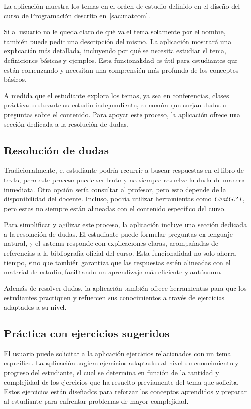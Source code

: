 \documentclass{article}
\begin{document}
La aplicación muestra los temas en el orden de estudio definido en el diseño del curso de Programación descrito en~\ref{sac:matcom}.

Si al usuario no le queda claro de qué va el tema solamente por el nombre, también puede pedir una descripción del mismo. La aplicación mostrará una explicación más detallada, incluyendo por qué se necesita estudiar el tema, definiciones básicas y ejemplos. Esta funcionalidad es útil para estudiantes que están comenzando y necesitan una comprensión más profunda de los conceptos básicos.

A medida que el estudiante explora los temas, ya sea en conferencias, clases prácticas o durante su estudio independiente, es común que surjan dudas o preguntas sobre el contenido. Para apoyar este proceso, la aplicación ofrece una sección dedicada a la resolución de dudas.

\subsection{Resolución de dudas}

Tradicionalmente, el estudiante podría recurrir a buscar respuestas en el libro de texto, pero este proceso puede ser lento y no siempre resuelve la duda de manera inmediata. Otra opción sería consultar al profesor, pero esto depende de la disponibilidad del docente. Incluso, podría utilizar herramientas como \textit{ChatGPT}, pero estas no siempre están alineadas con el contenido específico del curso.

Para simplificar y agilizar este proceso, la aplicación incluye una sección dedicada a la resolución de dudas. El estudiante puede formular preguntas en lenguaje natural, y el sistema responde con explicaciones claras, acompañadas de referencias a la bibliografía oficial del curso. Esta funcionalidad no solo ahorra tiempo, sino que también garantiza que las respuestas estén alineadas con el material de estudio, facilitando un aprendizaje más eficiente y autónomo.

Además de resolver dudas, la aplicación también ofrece herramientas para que los estudiantes practiquen y refuercen sus conocimientos a través de ejercicios adaptados a su nivel.

\subsection{Práctica con ejercicios sugeridos}

El usuario puede solicitar a la aplicación ejercicios relacionados con un tema específico. La aplicación sugiere ejercicios adaptados al nivel de conocimiento y progreso del estudiante, el cual se determina en función de la cantidad y complejidad de los ejercicios que ha resuelto previamente del tema que solicita. Estos ejercicios están diseñados para reforzar los conceptos aprendidos y preparar al estudiante para enfrentar problemas de mayor complejidad.
\end{document}
